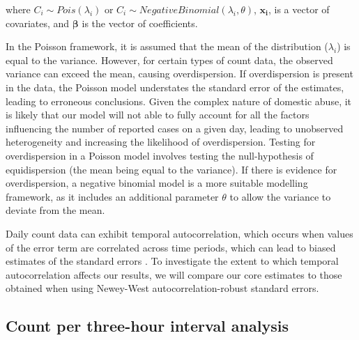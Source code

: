 \documentclass[12pt, a4paper]{article}
\newcommand{\vect}[1]{\boldsymbol{#1}}
\begin{document}
where 
$C_i \sim Pois(\lambda_i)$ or $C_i \sim Negative Binomial(\lambda_i,\theta)$, $\vect{x_i}$, is a vector of covariates, and $\boldsymbol{\beta}$ is the vector of coefficients.

In the Poisson framework, it is assumed that the mean of the distribution ($\lambda_i$) is equal to the variance. 
However, for certain types of count data, the observed variance can exceed the mean, causing overdispersion. 
If overdispersion is present in the data, the Poisson model understates the standard error of the estimates, leading to erroneous conclusions. 
Given the complex nature of domestic abuse, it is likely that our model will not able to fully account for all the factors influencing the number of reported cases on a given day, leading to unobserved heterogeneity and increasing the likelihood of overdispersion. 
Testing for overdispersion in a Poisson model involves testing the null-hypothesis of equidispersion (the mean being equal to the variance).
If there is evidence for overdispersion, a negative binomial model is a more suitable modelling framework, as it includes an additional parameter $\theta$ to allow the variance to deviate from the mean. 

Daily count data can exhibit temporal autocorrelation, which occurs when values of the error term are correlated across time periods, which can lead to biased estimates of the standard errors \cite{Greene2002}. To investigate the extent to which temporal autocorrelation affects our results, we will compare our core estimates to those obtained when using Newey-West autocorrelation-robust standard errors.


\subsection{Count per three-hour interval analysis}
\end{document}
